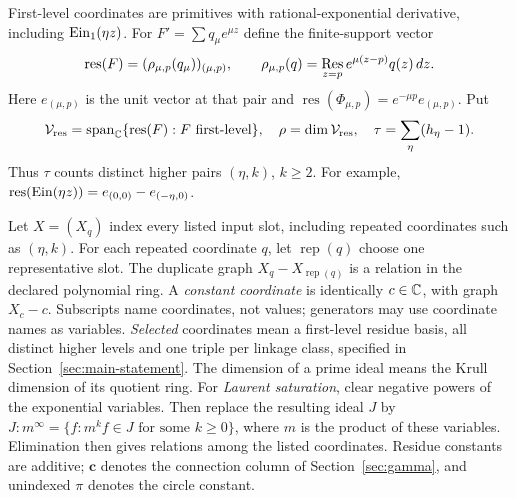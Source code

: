 First-level coordinates are primitives with rational-exponential
derivative, including $\operatorname{Ein}_1(\eta z)$. For
$F'=\sum q_\mu e^{\mu z}$ define the finite-support vector
\begin{equation}\label{eq:residue-vector}
\operatorname{res}(F)=(\rho_{\mu,p}(q_\mu))_{(\mu,p)},\qquad
\rho_{\mu,p}(q)=\operatorname*{Res}_{z=p}e^{\mu(z-p)}q(z)\,dz.
\end{equation}
Here $e_{(\mu,p)}$ is the unit vector at that pair and
$\operatorname{res}(\Phi_{\mu,p})=e^{-\mu p}e_{(\mu,p)}$. Put
\begin{equation}\label{eq:rank-data}
\mathcal V_{\rm res}=\operatorname{span}_{\mathbb{C}}\{\operatorname{res}(F):F\text{ first-level}\},\quad\rho=\dim\mathcal V_{\rm res},
\quad\tau=\sum_{\eta}(h_\eta-1).
\end{equation}
Thus $\tau$ counts distinct higher pairs $(\eta,k)$, $k\ge2$.
For example, $\operatorname{res}(\operatorname{Ein}(\eta z))=e_{(0,0)}-e_{(-\eta,0)}$.

Let $X=(X_q)$ index every listed input slot, including repeated coordinates
such as $(\eta,k)$. For each repeated coordinate $q$, let
$\operatorname{rep}(q)$ choose one representative slot. The duplicate graph
$X_q-X_{\operatorname{rep}(q)}$ is a relation in the declared polynomial ring.
A \emph{constant coordinate} is identically $c\in\mathbb{C}$, with graph $X_c-c$.
Subscripts name coordinates, not values; generators may use coordinate names
as variables. \emph{Selected} coordinates mean a first-level residue basis,
all distinct higher levels and one triple per linkage class, specified in
Section~\ref{sec:main-statement}.
The dimension of a prime ideal means the Krull dimension of its quotient
ring. For \emph{Laurent saturation}, clear negative powers of the
exponential variables. Then replace the resulting ideal $J$ by
$J:m^\infty=\{f:m^kf\in J\text{ for some }k\ge0\}$, where $m$ is
the product of these variables. Elimination then gives relations among the listed coordinates.
Residue constants are additive; $\mathbf c$ denotes the connection column
of Section~\ref{sec:gamma}, and unindexed $\pi$ denotes the circle constant.

